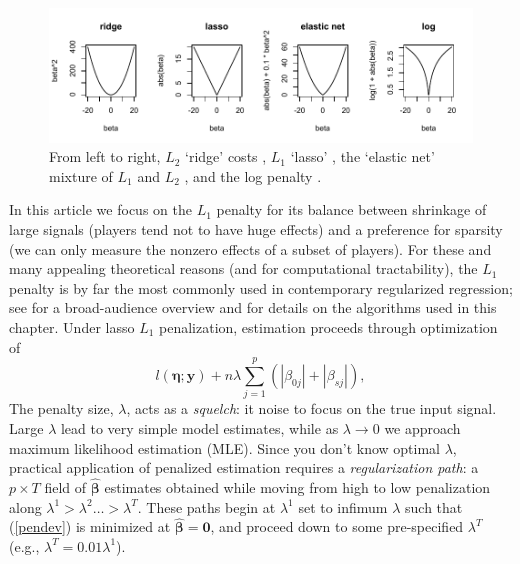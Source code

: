 \begin{figure}[t]
\includegraphics[width=\textwidth]{figures/penalties}
\caption{\label{costs} 
From left to right, 
$L_2$ `ridge' costs \cite{hoerl_ridge_1970}, $L_1$ `lasso' \cite{tibshirani_regression_1996}, the `elastic net' mixture of $L_1$ and $L_2$ \cite{zou_regularization_2005}, and the log penalty \cite{candes_enhancing_2008}.
}
\end{figure}

In this article we focus on the $L_1$ penalty for its balance between shrinkage of large signals (players tend not to have huge effects) and a preference for sparsity (we can only measure the nonzero effects of a subset of players).  For these and many appealing theoretical reasons (and for computational tractability), the $L_1$ penalty is by far the most commonly used in contemporary regularized regression; see \cite{hastie:tibsh:fried:2001} for a broad-audience overview and \cite{taddy_one-step_2015} for details on the algorithms used in this chapter.
Under lasso $L_1$ penalization, estimation proceeds through optimization of  
\begin{equation} \label{pendev}
l\left(\boldsymbol{\eta}; \mathbf{y}\right) + n\lambda \sum_{j=1}^p\left(|\beta_{0j}| + |\beta_{sj}|\right),
\end{equation}
The penalty size, $\lambda$, acts as a {\it squelch}: it   noise to
focus on the true input signal. Large $\lambda$ lead to very simple  model
estimates, while as $\lambda \rightarrow 0$ we approach maximum likelihood
estimation (MLE). Since you don't know optimal $\lambda$, practical
application of penalized estimation requires a {\it regularization path}: a $p
\times T$ field of $\boldsymbol{\hat\beta}$ estimates obtained while moving
from high to low penalization along $\lambda^1 > \lambda^2 \ldots >
\lambda^T$. These paths begin at $\lambda^1$ set to infimum $\lambda$ such
that (\ref{pendev}) is minimized at $\boldsymbol{\hat\beta} = \mathbf{0}$, and proceed
down to some pre-specified $\lambda^T$ (e.g., $\lambda^T= 0.01\lambda^1$).

